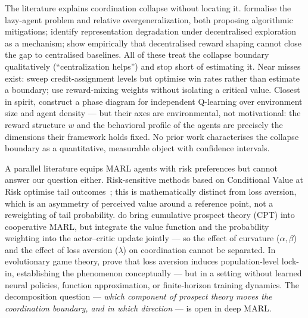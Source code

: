 \documentclass[11pt]{article}
\begin{document}
The literature explains coordination collapse without locating it.
\citet{liu2023lazy} formalise the lazy-agent problem and
\citet{peng2023curo} relative overgeneralization, both proposing
algorithmic mitigations; \citet{weng2026} identify representation
degradation under decentralised exploration as a mechanism;
\citet{dmarl2025} show empirically that decentralised reward shaping
cannot close the gap to centralised baselines.
All of these treat the collapse boundary qualitatively
(``centralization helps'') and stop short of estimating it.
Near misses exist: \citet{wang2025maca} sweep credit-assignment levels
but optimise win rates rather than estimate a boundary;
\citet{jiang2018dgn} use reward-mixing weights without isolating a
critical value.
Closest in spirit, \citet{yamaguchi2025} construct a phase diagram for
independent Q-learning over environment size and agent density --- but
their axes are environmental, not motivational: the reward structure $w$
and the behavioral profile of the agents are precisely the dimensions
their framework holds fixed.
No prior work characterises the collapse boundary as a quantitative,
measurable object with confidence intervals.

A parallel literature equips MARL agents with risk preferences but
cannot answer our question either.
Risk-sensitive methods based on Conditional Value at Risk optimise tail
outcomes~\citep{qiu2021rmix,xie2023riskq}; this is mathematically
distinct from loss aversion, which is an asymmetry of perceived value
around a reference point, not a reweighting of tail probability.
\citet{lalmohammed2025} do bring cumulative prospect theory (CPT) into
cooperative MARL, but integrate the value function and the probability
weighting into the actor--critic update jointly --- so the effect of
curvature ($\alpha,\beta$) and the effect of loss aversion ($\lambda$)
on coordination cannot be separated.
In evolutionary game theory, \citet{mengesha2025} prove that loss
aversion induces population-level lock-in, establishing the phenomenon
conceptually --- but in a setting without learned neural policies,
function approximation, or finite-horizon training dynamics.
The decomposition question --- \emph{which component of prospect theory
moves the coordination boundary, and in which direction} --- is open in
deep MARL.
\end{document}
